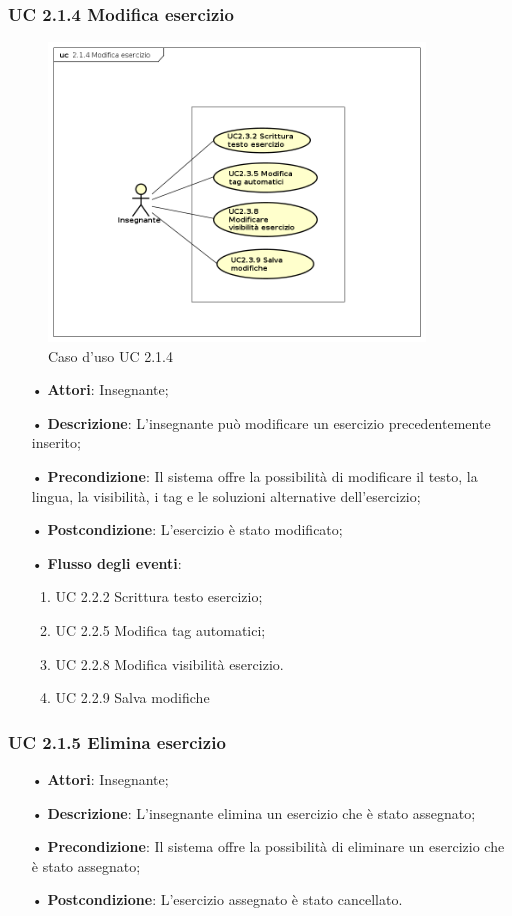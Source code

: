 \subsubsection{UC 2.1.4 Modifica esercizio}

\begin{figure}[H]
\centering
\includegraphics[width=10cm]{img/UC214.png} 
\caption{Caso d'uso UC 2.1.4}
\end{figure}

\begin{itemize}
	\item[•] \textbf{Attori}: Insegnante;
	\item[•] \textbf{Descrizione}: L’insegnante può modificare un esercizio precedentemente inserito;
	\item[•] \textbf{Precondizione}: Il sistema offre la possibilità di modificare il testo, la
				lingua, la visibilità, i {tag} e le soluzioni alternative 
				dell’esercizio;
	\item[•] \textbf{Postcondizione}: L’esercizio è stato modificato;
	\item[•] \textbf{Flusso degli eventi}:
		\begin{enumerate}
			\item UC 2.2.2 Scrittura testo esercizio;
			\item UC 2.2.5 Modifica tag automatici;
			\item UC 2.2.8 Modifica visibilità esercizio.
			\item UC 2.2.9 Salva modifiche
		\end{enumerate}
		    
\end{itemize}   	
\subsubsection{UC 2.1.5 Elimina esercizio}
\begin{itemize}
	\item[•] \textbf{Attori}: Insegnante;
	\item[•] \textbf{Descrizione}: L’insegnante elimina un esercizio che è stato assegnato;
	\item[•] \textbf{Precondizione}: Il sistema offre la possibilità di eliminare un esercizio che è stato assegnato;
	\item[•] \textbf{Postcondizione}: L’esercizio assegnato è stato cancellato.
\end{itemize}

